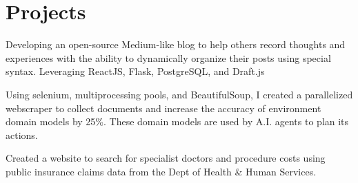 \documentclass[]{deedy-resume-openfont}
\begin{document}
\begin{minipage}[t]{0.66\textwidth}
\section{Projects}


\begin{tightemize}
\item Developing an open-source Medium-like blog to help others record thoughts and experiences with the ability to dynamically organize their posts using special syntax. Leveraging ReactJS, Flask, PostgreSQL, and Draft.js
\end{tightemize}
\sectionsep


\begin{tightemize}
\item Using selenium, multiprocessing pools, and BeautifulSoup, I created a parallelized webscraper to collect documents and increase the accuracy of environment domain models by 25\%. These domain models are used by A.I. agents to plan its actions.
\end{tightemize}
\sectionsep

\begin{tightemize}
\item Created a website to search for specialist doctors and procedure costs using public insurance claims data from the Dept of Health \& Human Services.
\end{tightemize}

\end{minipage}
\end{document}
